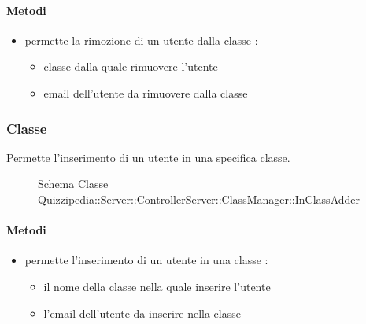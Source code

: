 \paragraph{Metodi}
\begin{itemize}
\item {}
\newline
permette la rimozione di un utente dalla classe
\newline
{} :
\begin{itemize}
\item {}
\newline
classe dalla quale rimuovere l'utente
\item {}
\newline
email dell'utente da rimuovere dalla classe
\end{itemize}
\end{itemize}
\subsubsection{Classe }
Permette l'inserimento di un utente in una specifica classe.
\begin{figure}[H]
\centering
\noindent{}
\caption[Schema Classe InClassAdder]{Schema Classe Quizzipedia::Server::ControllerServer::ClassManager::InClassAdder}
\end{figure}
\paragraph{Metodi}
\begin{itemize}
\item {}
\newline
permette l'inserimento di un utente in una classe
\newline
{} :
\begin{itemize}
\item {}
\newline
il nome della classe nella quale inserire l'utente
\item {}
\newline
l'email dell'utente da inserire nella classe
\end{itemize}
\end{itemize}
